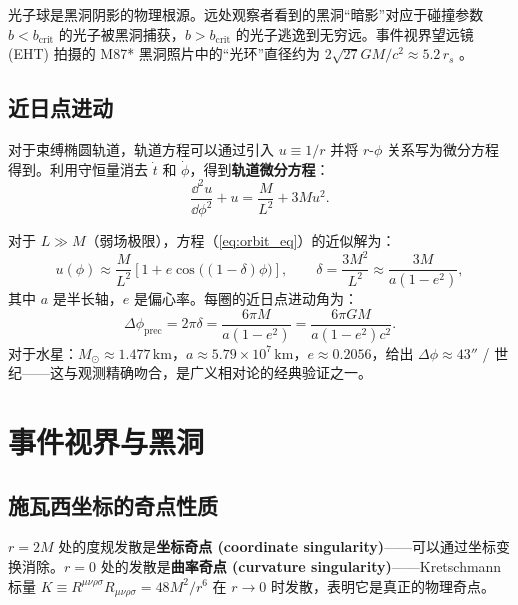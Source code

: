 \begin{note}[光子球与黑洞阴影]
光子球是黑洞阴影的物理根源。远处观察者看到的黑洞“暗影”对应于碰撞参数 $b < b_{\text{crit}}$ 的光子被黑洞捕获，$b > b_{\text{crit}}$ 的光子逃逸到无穷远。事件视界望远镜 (EHT) 拍摄的 M87* 黑洞照片中的“光环”直径约为 $2\sqrt{27}GM/c^2 \approx 5.2\,r_s$ \cite{Misner1973}。
\end{note}

\subsection{近日点进动}

对于束缚椭圆轨道，轨道方程可以通过引入 $u \equiv 1/r$ 并将 $r$-$\phi$ 关系写为微分方程得到。利用守恒量消去 $\dot t$ 和 $\dot\phi$，得到\textbf{轨道微分方程}：
\begin{equation}
    \frac{\dd^2 u}{\dd\phi^2} + u = \frac{M}{L^2} + 3Mu^2.
    \label{eq:orbit_eq}
\end{equation}

\begin{theorem}[水星近日点进动]
对于 $L \gg M$（弱场极限），方程（\ref{eq:orbit_eq}）的近似解为：
\begin{equation}
    u(\phi) \approx \frac{M}{L^2}\left[1 + e\cos\bigl((1-\delta)\phi\bigr)\right], \qquad \delta = \frac{3M^2}{L^2} \approx \frac{3M}{a(1-e^2)},
\end{equation}
其中 $a$ 是半长轴，$e$ 是偏心率。每圈的近日点进动角为：
\begin{equation}
    \boxed{\Delta\phi_{\text{prec}} = 2\pi\delta = \frac{6\pi M}{a(1-e^2)} = \frac{6\pi GM}{a(1-e^2)c^2}}.
\end{equation}
对于水星：$M_\odot \approx 1.477\,\text{km}$，$a \approx 5.79\times10^7\,\text{km}$，$e\approx0.2056$，给出 $\Delta\phi \approx 43''$ / 世纪——这与观测精确吻合，是广义相对论的经典验证之一。
\end{theorem}

\section{事件视界与黑洞}
\label{sec:horizon}

\subsection{施瓦西坐标的奇点性质}

\begin{definition}[坐标奇点与曲率奇点]
$r=2M$ 处的度规发散是\textbf{坐标奇点 (coordinate singularity)}——可以通过坐标变换消除。$r=0$ 处的发散是\textbf{曲率奇点 (curvature singularity)}——Kretschmann 标量 $K \equiv R^{\mu\nu\rho\sigma}R_{\mu\nu\rho\sigma} = 48M^2/r^6$ 在 $r\to 0$ 时发散，表明它是真正的物理奇点。
\end{definition}

